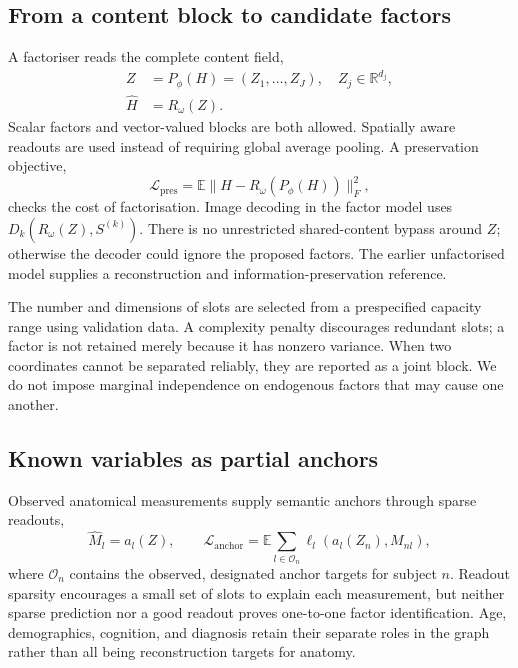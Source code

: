 \documentclass[10pt,twocolumn,letterpaper]{article}
\newcommand{\E}{\mathbb{E}}
\newcommand{\R}{\mathbb{R}}
\begin{document}
\subsection{From a content block to candidate factors}

A factoriser reads the complete content field,
\begin{align}
 Z&=P_\phi(H)=(Z_1,\ldots,Z_J),\quad Z_j\in\R^{d_j},\\
 \widehat H&=R_\omega(Z).
\end{align}
Scalar factors and vector-valued blocks are both allowed. Spatially aware readouts are used instead of requiring global average pooling. A preservation objective,
\begin{equation}
 \mathcal L_{\mathrm{pres}}=\E\|H-R_\omega(P_\phi(H))\|_F^2,
\end{equation}
checks the cost of factorisation. Image decoding in the factor model uses $D_k(R_\omega(Z),S^{(k)})$. There is no unrestricted shared-content bypass around $Z$; otherwise the decoder could ignore the proposed factors. The earlier unfactorised model supplies a reconstruction and information-preservation reference.

The number and dimensions of slots are selected from a prespecified capacity range using validation data. A complexity penalty discourages redundant slots; a factor is not retained merely because it has nonzero variance. When two coordinates cannot be separated reliably, they are reported as a joint block. We do not impose marginal independence on endogenous factors that may cause one another.

\subsection{Known variables as partial anchors}

Observed anatomical measurements supply semantic anchors through sparse readouts,
\begin{equation}
 \widehat M_l=a_l(Z),\qquad
 \mathcal L_{\mathrm{anchor}}=\E\sum_{l\in\mathcal O_n}
 \ell_l(a_l(Z_n),M_{nl}),
\end{equation}
where $\mathcal O_n$ contains the observed, designated anchor targets for subject $n$. Readout sparsity encourages a small set of slots to explain each measurement, but neither sparse prediction nor a good readout proves one-to-one factor identification. Age, demographics, cognition, and diagnosis retain their separate roles in the graph rather than all being reconstruction targets for anatomy.
\end{document}
